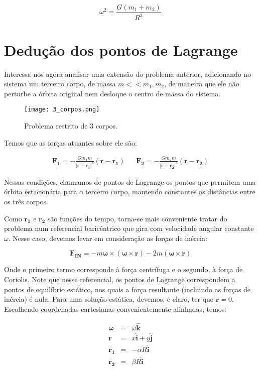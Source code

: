 \begin{equation}
\omega^2 = \frac{G(m_1+m_2)}{R^3} \label{kepi}
\end{equation}

\section{Dedução dos pontos de Lagrange}

Interessa-nos agora analisar uma extensão do problema anterior, adicionando no sistema um terceiro corpo, de massa $m<<m_1,m_2$, de maneira que ele não perturbe a órbita original nem desloque o centro de massa do sistema. 

\begin{figure}[H]
\centering
\texttt{[image: 3\_corpos.png]}
\caption{Problema restrito de 3 corpos.}
\end{figure}


Temos que as forças atuantes sobre ele são:

\begin{align}
\mathbf{F_1} = -\frac{Gm_1m}{|\mathbf{r}-\mathbf{r_1}|^3}(\mathbf{r}-\mathbf{r_1}) && \mathbf{F_2} = -\frac{Gm_2m}{|\mathbf{r}-\mathbf{r_2}|^3}(\mathbf{r}-\mathbf{r_2})
\end{align}

Nessas condições, chamamos de pontos de Lagrange os pontos que permitem uma órbita estacionária para o terceiro corpo, mantendo constantes as distâncias entre os três corpos.

Como $\mathbf{r_1}$ e $\mathbf{r_2}$ são funções do tempo, torna-se mais conveniente tratar do problema num referencial baricêntrico que gira com velocidade angular constante $\omega$. Nesse caso, devemos levar em consideração as forças de inércia:

\begin{equation}
\mathbf{F_{IN}} = -m\boldsymbol{\omega} \times (\boldsymbol{\omega} \times \mathbf{r}) -2m(\mathbf{\omega} \times \mathbf{\dot{r}}) 
\end{equation}

Onde o primeiro termo corresponde à força centrífuga e o segundo, à força de Coriolis. Note que nesse referencial, os pontos de Lagrange correspondem a pontos de equilíbrio estático, nos quais a força resultante (incluindo as forças de inércia) é nula. Para uma solução estática, devemos, é claro, ter que $\mathbf{\dot{r}}=0$. Escolhendo coordenadas cartesianas convenientemente alinhadas, temos:

\begin{eqnarray}
\boldsymbol{\omega} & = & \omega\mathbf{\hat{k}} \\
\mathbf{r} \; & = & x\mathbf{\hat{i}} + y\mathbf{\hat{j}} \\
\mathbf{r_1} & = & -\alpha R\mathbf{\hat{i}} \\
\mathbf{r_2} & = & \beta R\mathbf{\hat{i}} \\
\end{eqnarray}

